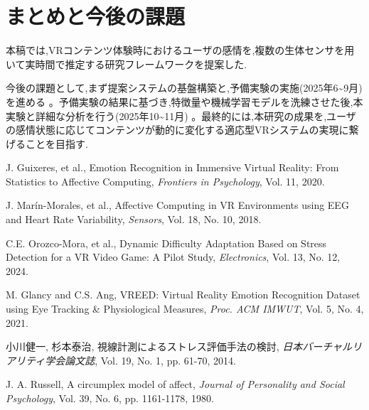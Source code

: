 \documentclass[paper=a4paper,fontsize=10pt,jafontscale=0.925,twocolumn]{jlreq}
\begin{document}
\section{まとめと今後の課題}

本稿では,VRコンテンツ体験時におけるユーザの感情を,複数の生体センサを用いて実時間で推定する研究フレームワークを提案した.

今後の課題として,まず提案システムの基盤構築と,予備実験の実施(2025年6\textasciitilde9月)を進める 。予備実験の結果に基づき,特徴量や機械学習モデルを洗練させた後,本実験と詳細な分析を行う(2025年10\textasciitilde11月) 。最終的には,本研究の成果を,ユーザの感情状態に応じてコンテンツが動的に変化する適応型VRシステムの実現に繋げることを目指す.

\begin{thebibliography}{10}

J. Guixeres, et al., Emotion Recognition in Immersive Virtual Reality: From Statistics to Affective Computing, \textit{Frontiers in Psychology}, Vol. 11, 2020. 

J. Marín-Morales, et al., Affective Computing in VR Environments using EEG and Heart Rate Variability, \textit{Sensors}, Vol. 18, No. 10, 2018. 

C.E. Orozco-Mora, et al., Dynamic Difficulty Adaptation Based on Stress Detection for a VR Video Game: A Pilot Study, \textit{Electronics}, Vol. 13, No. 12, 2024. 

M. Glancy and C.S. Ang, VREED: Virtual Reality Emotion Recognition Dataset using Eye Tracking \& Physiological Measures, \textit{Proc. ACM IMWUT}, Vol. 5, No. 4, 2021. 

小川健一, 杉本泰治, 視線計測によるストレス評価手法の検討, \textit{日本バーチャルリアリティ学会論文誌}, Vol. 19, No. 1, pp. 61-70, 2014. 

J. A. Russell, A circumplex model of affect, \textit{Journal of Personality and Social Psychology}, Vol. 39, No. 6, pp. 1161-1178, 1980.

\end{thebibliography}
\end{document}
